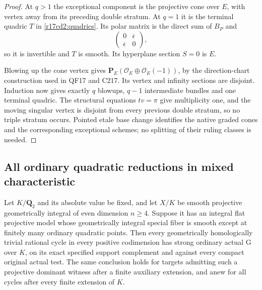 \begin{proof}
At $q>1$ the exceptional component is the projective
cone over $E$, with vertex away from its preceding
double stratum. At $q=1$ it is the terminal quadric $T$
in \eqref{r17cd2:quadrics}. Its polar matrix is the
direct sum of $B_P$ and
\[
             \begin{pmatrix}0&\overline\epsilon\\
                             \overline\epsilon&0\end{pmatrix},
\]
so it is invertible and $T$ is smooth. Its hyperplane
section $S=0$ is $E$.

Blowing up the cone vertex gives
$\mathbf P_E(\mathcal O_E\oplus\mathcal O_E(-1))$,
by the direction-chart construction used in QF17 and
C217. Its vertex and infinity sections are disjoint.
Induction now gives exactly $q$ blowups, $q-1$
intermediate bundles and one terminal quadric. The
structural equations $tv=\pi$ give multiplicity one,
and the moving singular vertex is disjoint from every
previous double stratum, so no triple stratum occurs.
Pointed etale base change identifies the native graded
cones and the corresponding exceptional schemes; no
splitting of their ruling classes is needed.
\end{proof}

\subsection{All ordinary quadratic reductions in mixed characteristic}

\begin{theorem}
\label{r17cd2:actual}
Let $K/\mathbf Q_2$ and its absolute value be fixed,
and let $X/K$ be smooth projective geometrically integral
of even dimension $n\ge4$. Suppose it has an integral
flat projective model whose geometrically integral special
fiber is smooth except at finitely many ordinary quadratic
points. Then every geometrically homologically trivial
rational cycle in every positive codimension has strong
ordinary actual G over $K$, on its exact specified support
complement and against every compact original actual test.
The same conclusion holds for targets admitting such a
projective dominant witness after a finite auxiliary
extension, and anew for all cycles after every finite
extension of $K$.
\end{theorem}

